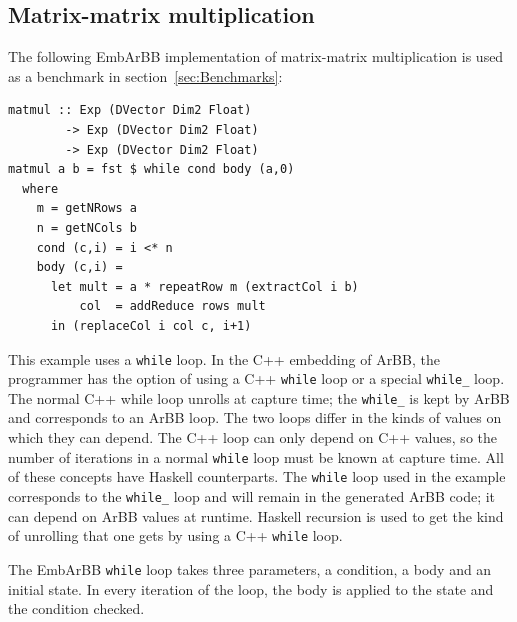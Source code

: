 
\subsection{Matrix-matrix multiplication}

The following EmbArBB implementation of matrix-matrix multiplication is used as a benchmark in section~\ref{sec:Benchmarks}:

\begin{verbatim} 
matmul :: Exp (DVector Dim2 Float) 
        -> Exp (DVector Dim2 Float) 
        -> Exp (DVector Dim2 Float) 
matmul a b = fst $ while cond body (a,0)
  where 
    m = getNRows a
    n = getNCols b 
    cond (c,i) = i <* n
    body (c,i) = 
      let mult = a * repeatRow m (extractCol i b)
          col  = addReduce rows mult 
      in (replaceCol i col c, i+1) 
\end{verbatim}

This example uses a {\tt while} loop. In the C++ embedding of ArBB, the programmer 
has the option of using a C++ {\tt while} loop or a special {\tt while\_} loop. The 
normal C++ while loop unrolls at capture time; the {\tt while\_} is kept by ArBB 
and corresponds to an ArBB loop. The two loops differ in the kinds of
values on which they can depend.
The C++ loop can only depend on C++ values, so
the number of iterations in a normal {\tt while} loop must be known at capture 
time. All of these concepts have Haskell counterparts. The {\tt while} loop used in the 
example corresponds to the {\tt while\_} loop and will remain in the generated ArBB 
code; it can depend on ArBB values at runtime.
Haskell recursion is used to get the kind of unrolling 
that one gets by using a C++ {\tt while} loop. 
 
The EmbArBB {\tt while} loop takes three parameters, a condition, a body and an initial state. 
In every iteration of the loop, the body is applied to the state and the condition checked.


